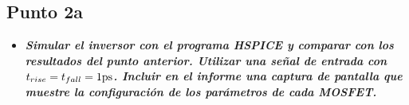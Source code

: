 
\subsection{Punto \textbf{2a}}

\begin{itemize}
\item \emph{\textbf{Simular el inversor con el programa HSPICE y comparar con los resultados del punto anterior. Utilizar una señal de entrada con $t_{rise} = t_{fall} = 1 \si[per-mode=symbol]{\pico\second}$. Incluir en el informe una captura de pantalla que muestre la configuración de los parámetros de cada MOSFET.}}
\end{itemize}

